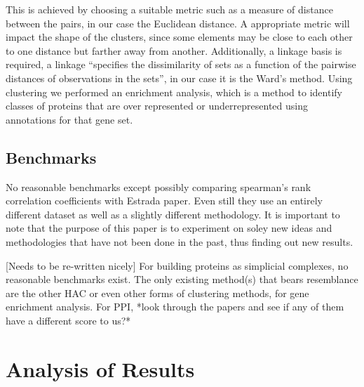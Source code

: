 \documentclass[9pt]{article}
\begin{document}
This is achieved by choosing a suitable metric such as a measure of distance between the pairs, in our case the Euclidean distance. A appropriate metric will impact the shape of the clusters, since some elements may be close to each other to one distance but farther away from another. Additionally, a linkage basis is required, a linkage “specifies the dissimilarity of sets as a function of the pairwise distances of observations in the sets”, in our case it is the Ward’s method.  Using clustering we performed an enrichment analysis, which is a method to identify classes of proteins that are over represented or underrepresented using annotations for that gene set. 

\subsection{Benchmarks}
No reasonable benchmarks except possibly comparing spearman’s rank correlation coefficients with Estrada paper. Even still they use an entirely different dataset as well as a slightly different methodology. It is important to note that the purpose of this paper is to experiment on soley new ideas and methodologies that have not been done in the past, thus finding out new results.  

[Needs to be re-written nicely]
For building proteins as simplicial complexes, no reasonable benchmarks exist. The only existing method(s) that bears resemblance are the other HAC or even other forms of clustering methods, for gene enrichment analysis. 
For PPI, *look through the papers and see if any of them have a different score to us?*

\newpage
\section{Analysis of Results}
\end{document}
